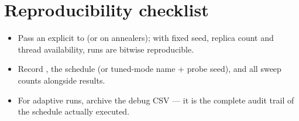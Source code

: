 \section{Reproducibility checklist}

\begin{itemize}
\item Pass an explicit  to  (or
 on annealers); with fixed seed, replica count and thread
availability, runs are bitwise reproducible.
\item Record , the schedule (or tuned-mode
name + probe seed), and all sweep counts alongside results.
\item For adaptive runs, archive the debug CSV --- it is the complete audit
trail of the schedule actually executed.
\end{itemize}
